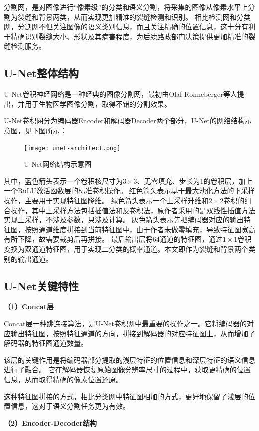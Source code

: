 分割网，是对图像进行“像素级”的分类和语义分割，将采集的图像从像素水平上分割为裂缝和背景两类，从而实现更加精准的裂缝检测和识别。
相比检测网和分类网，分割网不但关注图像的语义类别信息，而且关注精确的位置信息，这十分有利于精确识别裂缝大小、形状及其病害程度，为后续路政部门决策提供更加精准的裂缝检测服务。

\subsection{U-Net整体结构}
U-Net卷积神经网络是一种经典的图像分割网，最初由Olaf Ronneberger等人提出，并用于生物医学图像分割，取得不错的分割效果。

U-Net卷积网分为编码器Encoder和解码器Decoder两个部分，U-Net的网络结构示意图，见下图所示：

\begin{figure}[h]
	\texttt{[image: unet-architect.png]}
	\caption{U-Net网络结构示意图}
	\label{unet-architect}
\end{figure}

其中，蓝色箭头表示一个卷积核尺寸为$3\times3$、无零填充、步长为1的卷积层，加上一个RuLU激活函数层的标准卷积操作。
红色箭头表示基于最大池化方法的下采样操作，主要用于实现特征图降维。
绿色箭头表示一个上采样升维和$2\times2$卷积的组合操作，其中上采样方法包括插值法和反卷积法，原作者采用的是双线性插值方法实现上采样，不涉及参数，只涉及计算。
灰色箭头表示先把编码器对应的输出特征图，按照通道维度拼接到当前特征图中，由于作者未做零填充，导致特征图宽高有所下降，故需要裁剪后再拼接。
最后输出层将64通道的特征图，通过$1\times1$卷积变换为双通道特征图，用于实现二分类的概率通道。本文即作为裂缝和背景两个类别的输出通道。

\subsection{U-Net关键特性}

\textbf{（1）Concat层}

Concat层一种跳连接算法，是U-Net卷积网中最重要的操作之一。它将编码器的对应输出特征图，按照特征通道的方向，拼接到解码器的对应特征图上，从而增加了解码器的特征图通道数量。

该层的关键作用是将编码器部分提取的浅层特征的位置信息和深层特征的语义信息进行了融合。
它在解码器恢复原始图像分辨率尺寸的过程中，获取更精确的位置信息，从而取得精确的像素位置还原。

这种特征图拼接的方式，相比分类网中特征图相加的方式，更好地保留了浅层的位置信息，这对于语义分割任务更为有效。


\textbf{（2）Encoder-Decoder结构}


